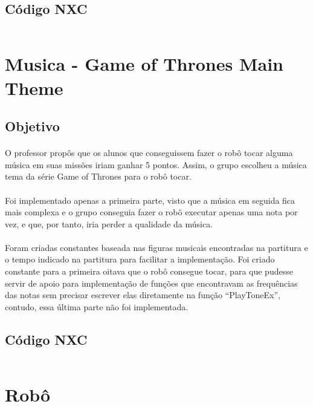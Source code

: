 \documentclass{article}
\begin{document}
	\subsection{Código NXC}
		\inputminted[linenos, frame = single]{c}{../ZonaDeSeguranca.nxc}

\newpage
\section{Musica - Game of Thrones Main Theme}
	\subsection{Objetivo}
		\paragraph{}
			O professor propôs que os alunos que conseguissem fazer o robô tocar 
			alguma música em suas missões iriam ganhar 5 pontos. Assim, o grupo 
			escolheu a música tema da série Game of Thrones para o robô tocar.
		\paragraph{}
			Foi implementado apenas a primeira parte, visto que a música em 
			seguida fica mais complexa e o grupo conseguia fazer o robô executar 
			apenas uma nota por vez, e que, por tanto, iria perder a qualidade 
			da música.
		\paragraph{}
			Foram criadas constantes baseada nas figuras musicais encontradas na 
			partitura e o tempo indicado na partitura para facilitar a 
			implementação. Foi criado constante para a primeira oitava que o 
			robô consegue tocar, para que pudesse servir de apoio para 
			implementação de funções que encontravam as frequências das notas 
			sem precisar escrever elas diretamente na função “PlayToneEx”, 
			contudo, essa última parte não foi implementada.

	\subsection{Código NXC}
		\inputminted[linenos, frame = single]{c}{../GameOfThrones.nxc}

\newpage
\section{Robô}
\end{document}
